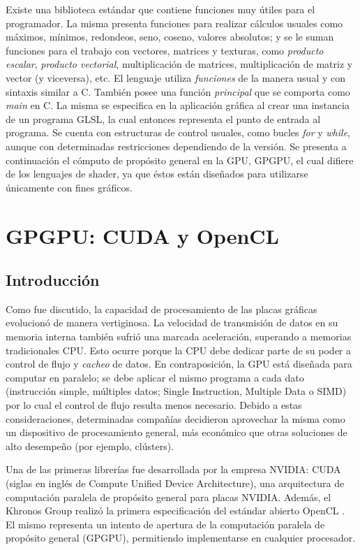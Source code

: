 Existe una biblioteca est\'andar que contiene funciones muy \'utiles para el programador. La misma presenta funciones para realizar c\'alculos usuales como m\'aximos, m\'inimos, redondeos, seno, coseno, valores absolutos; y se le suman funciones para el trabajo con vectores, matrices y texturas, como {\em producto escalar}, {\em producto vectorial}, multiplicaci\'on de matrices, multiplicaci\'on de matriz y vector (y viceversa), etc.
El lenguaje utiliza {\em funciones} de la manera usual y con sintaxis similar a C.
Tambi\'en posee una funci\'on {\em principal} que se comporta como {\em main} en C.
La misma se especifica en la aplicaci\'on gr\'afica al crear una instancia de un programa GLSL, la cual entonces representa el punto de entrada al programa.
Se cuenta con estructuras de control usuales, como bucles {\em for} y {\em while}, aunque con determinadas restricciones dependiendo de la versión.
Se presenta a continuaci\'on el cómputo de prop\'osito general en la GPU, GPGPU, el cual difiere de los lenguajes de shader, ya que éstos est\'an dise\~nados para utilizarse \'unicamente con fines gr\'aficos.

\section{GPGPU: CUDA y OpenCL}

\subsection{Introducción}
Como fue discutido, la capacidad de procesamiento de las placas gr\'aficas evolucionó de manera vertiginosa.
La velocidad de transmisi\'on de datos en su memoria interna tambi\'en sufrió una marcada aceleración, superando a memorias tradicionales CPU.
Esto ocurre porque la CPU debe dedicar parte de su poder a control de flujo y {\em cacheo} de datos.
En contraposici\'on, la GPU est\'a dise\~nada para computar en paralelo; se debe aplicar el mismo programa a cada dato (instrucción simple, múltiples datos; Single Instruction, Multiple Data o \acrshort{SIMD}) por lo cual el control de flujo resulta menos necesario.
Debido a estas consideraciones, determinadas compañías decidieron aprovechar la misma como un dispositivo de procesamiento general, más económico que otras soluciones de alto desempeño (por ejemplo, clústers).


Una de las primeras librerías fue desarrollada por la empresa NVIDIA: \acrshort{CUDA} (siglas en ingl\'es de Compute Unified Device Architecture), una arquitectura de computaci\'on paralela de prop\'osito general para placas NVIDIA.
Además, el Khronos Group realizó la primera especificación del estándar abierto OpenCL \cite{Stone2010}.
El mismo representa un intento de apertura de la computación paralela de propósito general (GPGPU), permitiendo implementarse en cualquier procesador.

